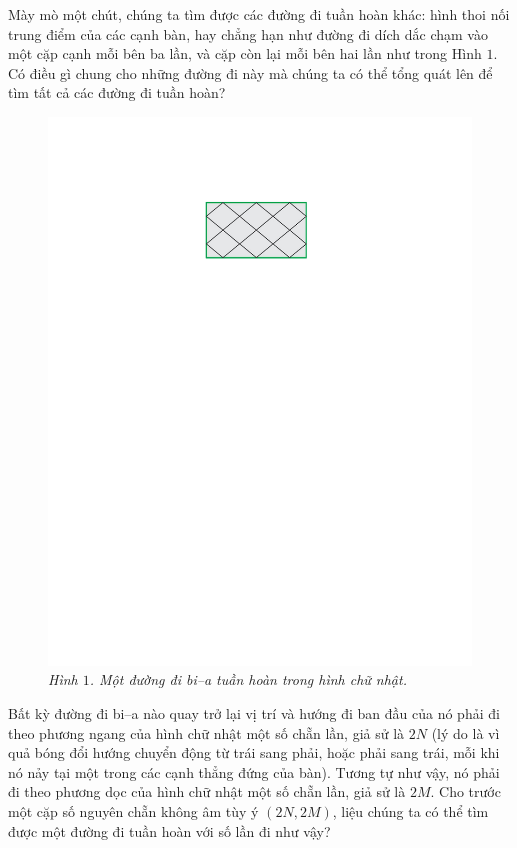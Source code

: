\begin{multicols}{2}
	Mày mò một chút, chúng ta tìm được các đường đi tuần hoàn khác: hình thoi nối trung điểm của các cạnh bàn, hay chẳng hạn như đường đi dích dắc chạm vào một cặp cạnh mỗi bên ba lần, và cặp còn lại mỗi bên hai lần như trong Hình $1$. Có điều gì chung cho những
	đường đi này mà chúng ta có thể tổng quát lên để tìm tất cả các đường đi tuần hoàn?
	\begin{figure}[H]
		\vspace*{-5pt}
		\centering
		\captionsetup{labelformat= empty, justification=centering}
		\includegraphics[width= 1\linewidth]{1}
		\caption{\small\textit{\color{duongvaotoanhoc}Hình $1$. Một đường đi bi--a tuần hoàn trong hình chữ nhật.}}
		\vspace*{-10pt}
	\end{figure}
	Bất kỳ đường đi bi--a nào quay trở lại vị trí và hướng đi ban đầu của nó phải đi theo phương ngang của hình chữ nhật một số chẵn lần, giả sử là $2N$ (lý do là vì quả bóng đổi hướng chuyển động  từ trái sang phải, hoặc phải sang trái, mỗi khi nó nảy tại một trong các cạnh thẳng đứng của bàn). Tương tự như vậy, nó phải đi theo phương dọc của hình chữ nhật một số chẵn lần, giả sử là $2M$. Cho trước một cặp số nguyên chẵn không âm tùy ý $(2N, 2M)$, liệu chúng ta có thể tìm được một đường đi tuần hoàn với số lần đi như vậy?

\end{multicols}
